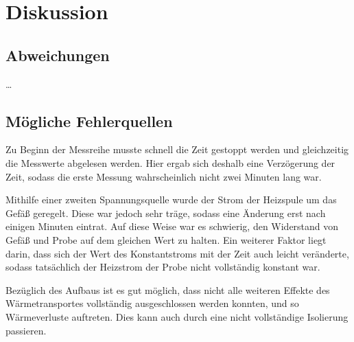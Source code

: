 \section{Diskussion}
\label{sec:diskussion}

\subsection{Abweichungen}

…


\subsection{Mögliche Fehlerquellen}

    Zu Beginn der Messreihe musste schnell die Zeit gestoppt werden und gleichzeitig die Messwerte abgelesen werden.
    Hier ergab sich deshalb eine Verzögerung der Zeit,
    sodass die erste Messung wahrscheinlich nicht zwei Minuten lang war.

    Mithilfe einer zweiten Spannungsquelle wurde der Strom der Heizspule um das Gefäß geregelt.
    Diese war jedoch sehr träge,
    sodass eine Änderung erst nach einigen Minuten eintrat.
    Auf diese Weise war es schwierig,
    den Widerstand von Gefäß und Probe auf dem gleichen Wert zu halten.
    Ein weiterer Faktor liegt darin,
    dass sich der Wert des Konstantstroms mit der Zeit auch leicht veränderte,
    sodass tatsächlich der Heizstrom der Probe nicht vollständig konstant war.

    Bezüglich des Aufbaus ist es gut möglich,
    dass nicht alle weiteren Effekte des Wärmetransportes vollständig ausgeschlossen werden konnten,
    und so Wärmeverluste auftreten.
    Dies kann auch durch eine nicht vollständige Isolierung passieren.
